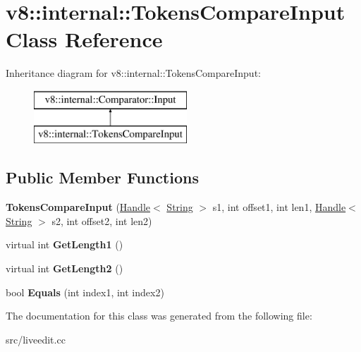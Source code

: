 \hypertarget{classv8_1_1internal_1_1_tokens_compare_input}{}\section{v8\+:\+:internal\+:\+:Tokens\+Compare\+Input Class Reference}
\label{classv8_1_1internal_1_1_tokens_compare_input}
Inheritance diagram for v8\+:\+:internal\+:\+:Tokens\+Compare\+Input\+:\begin{figure}[H]
\begin{center}
\leavevmode
\includegraphics[height=2.000000cm]{classv8_1_1internal_1_1_tokens_compare_input}
\end{center}
\end{figure}
\subsection*{Public Member Functions}
\begin{DoxyCompactItemize}
\item 
\hypertarget{classv8_1_1internal_1_1_tokens_compare_input_a4ff5ecf8d53b563347866122e2b9ec09}{}{\bfseries Tokens\+Compare\+Input} (\hyperlink{classv8_1_1internal_1_1_handle}{Handle}$<$ \hyperlink{classv8_1_1internal_1_1_string}{String} $>$ s1, int offset1, int len1, \hyperlink{classv8_1_1internal_1_1_handle}{Handle}$<$ \hyperlink{classv8_1_1internal_1_1_string}{String} $>$ s2, int offset2, int len2)\label{classv8_1_1internal_1_1_tokens_compare_input_a4ff5ecf8d53b563347866122e2b9ec09}

\item 
\hypertarget{classv8_1_1internal_1_1_tokens_compare_input_aa0bcd3da38b02db2217a4326c52e9127}{}virtual int {\bfseries Get\+Length1} ()\label{classv8_1_1internal_1_1_tokens_compare_input_aa0bcd3da38b02db2217a4326c52e9127}

\item 
\hypertarget{classv8_1_1internal_1_1_tokens_compare_input_a6e7b76d46775f133ad411d493a5f3536}{}virtual int {\bfseries Get\+Length2} ()\label{classv8_1_1internal_1_1_tokens_compare_input_a6e7b76d46775f133ad411d493a5f3536}

\item 
\hypertarget{classv8_1_1internal_1_1_tokens_compare_input_ac2fba90f89f1d179a99c7f172ddfbc52}{}bool {\bfseries Equals} (int index1, int index2)\label{classv8_1_1internal_1_1_tokens_compare_input_ac2fba90f89f1d179a99c7f172ddfbc52}

\end{DoxyCompactItemize}


The documentation for this class was generated from the following file\+:\begin{DoxyCompactItemize}
\item 
src/liveedit.\+cc\end{DoxyCompactItemize}
